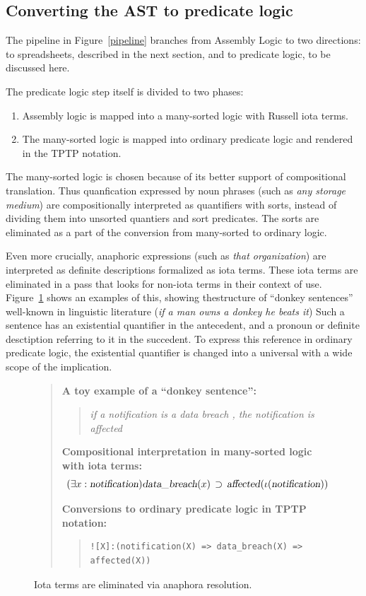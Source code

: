 \documentclass{IOS-Book-Article}
\newcommand{\eop}[1]{\mbox{\textsl{#1}}}
\newcommand{\bequ}{\begin{quote}}
\newcommand{\enqu}{\end{quote}}
\begin{document}
\subsection{Converting the AST to predicate logic}

The pipeline in Figure~\ref{pipeline} branches from Assembly Logic to two directions: to spreadsheets, described in the next section, and to predicate logic, to be discussed here.

The predicate logic step itself is divided to two phases:
\begin{enumerate}
\item Assembly logic is mapped into a many-sorted logic with Russell iota terms.
\item The many-sorted logic is mapped into ordinary predicate logic and rendered in the TPTP notation.
\end{enumerate}
The many-sorted logic is chosen because of its better support of compositional translation.
Thus quanfication expressed by noun phrases (such as \textit{any storage medium}) are compositionally interpreted as quantifiers with sorts, instead of dividing them into unsorted quantiers and sort predicates.
The sorts are eliminated as a part of the conversion from many-sorted to ordinary logic.

Even more crucially, anaphoric expressions (such as \textit{that organization}) are interpreted as definite descriptions formalized as iota terms.
These iota terms are eliminated in a pass that looks for non-iota terms in their context of use.
Figure~\ref{anaphora} shows an examples of this, showing thestructure of ``donkey sentences'' well-known in linguistic literature (\textit{if a man owns a donkey he beats it}) \cite{geach-1962,kamp-1981}
Such a sentence has an existential quantifier in the antecedent, and a pronoun or definite desctiption referring to it in the succedent.
To express this reference in ordinary predicate logic, the existential quantifier is changed into a universal with a wide scope of the implication.

 \begin{figure}
  \begin{framed}
  \bequ
  \textbf{A toy example of a ``donkey sentence'':}
  \bequ
 \textit{if a notification is a data breach , the notification is affected}
 \enqu

 \textbf{Compositional interpretation in many-sorted logic with iota terms:}
 \[
(\exists x : \eop{notification})\eop{data\_breach}(x) \, \supset \, \eop{affected}(\iota(\eop{notification}))
\]

 \textbf{Conversions to ordinary predicate logic in TPTP notation:}
 \bequ
\begin{verbatim}
![X]:(notification(X) => data_breach(X) => affected(X))
\end{verbatim}
 \enqu
 \enqu
   \end{framed}
 \caption{Iota terms are eliminated via anaphora resolution.
 }
\label{anaphora}
\end{figure}
\end{document}
